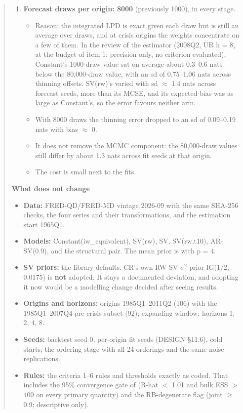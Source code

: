 \begin{quote}
\begin{enumerate}
\begin{itemize}
detail, and per cell in the JSON (, ); it never
enters a rule.
\end{itemize}
\item \textbf{Forecast draws per origin: 8000} (previously 1000), in every stage.
\begin{itemize}
\item Reason: the integrated LPD is exact given each draw but is still an average over draws, and at
crisis origins the weights concentrate on a few of them. In the review of the estimator (2008Q2, UR
h = 8, at the budget of item 1; precision only, no criterion evaluated), Constant's 1000-draw value
sat on average about 0.3--0.6 nats below the 80,000-draw value, with an sd of 0.75--1.06 nats across
thinning offsets. SV(rw)'s varied with sd $\approx$ 1.4 nats across forecast seeds, more than its
MCSE, and its expected bias was as large as Constant's, so the error favours neither arm.
\item With 8000 draws the thinning error dropped to an sd of 0.09--0.19 nats with bias $\approx$ 0.
\item It does not remove the MCMC component: the 80,000-draw values still differ by about 1.3 nats
across fit seeds at that origin.
\item The cost is small next to the fits.
\end{itemize}
\end{enumerate}

\medskip\noindent\textbf{What does not change}
\begin{itemize}
\item \textbf{Data:} FRED-QD/FRED-MD vintage 2026-09 with the same SHA-256 checks, the four series
and their transformations, and the estimation start 1965Q1.
\item \textbf{Models:} Constant(iw\_equivalent), SV(rw), SV, SV(rw,t10), AR-SV(0.9), and the
structural pair. The mean prior is   
   with p = 4.
\item \textbf{SV priors:} the library defaults. CR's own RW-SV $\sigma^2$ prior IG(1/2, 0.0175) is
\textbf{not} adopted. It stays a documented deviation, and adopting it now would be a modelling
change decided after seeing results.
\item \textbf{Origins and horizons:} origins 1985Q1--2011Q2 (106) with the 1985Q1--2007Q4
pre-crisis subset (92); expanding window; horizons 1, 2, 4, 8.
\item \textbf{Seeds:} backtest seed 0, per-origin fit seeds (DESIGN \S 11.6), cold starts; the
ordering stage with all 24 orderings and the same noise replications.
\item \textbf{Rules:} the criteria 1--6 rules and thresholds exactly as coded. That includes the 95\%
convergence gate of  (R-hat $<$ 1.01 and bulk ESS $>$ 400 on every primary quantity)
and the RB-degenerate flag (joint  $\ge$ 0.9; descriptive only).
\end{itemize}


\end{quote}
